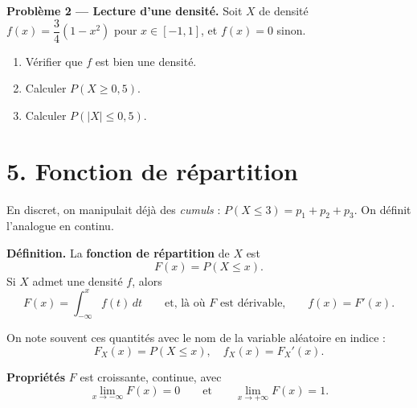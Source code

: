\textbf{Problème 2 --- Lecture d'une densité.}
Soit $X$ de densité $f(x)=\dfrac{3}{4}(1-x^2)$ pour $x\in[-1,1]$,
et $f(x)=0$ sinon.
\begin{enumerate}
  \item Vérifier que $f$ est bien une densité.
  \item Calculer $P(X\ge 0{,}5)$.
  \item Calculer $P(|X|\le 0{,}5)$.
\end{enumerate}

\section*{5. Fonction de répartition}

En discret, on manipulait déjà des \emph{cumuls} :
\(P(X\le 3)=p_1+p_2+p_3\).
On définit l'analogue en continu.

\begin{mdframed}[backgroundcolor=ThemeLight, linecolor=Theme,
  linewidth=1pt, innertopmargin=8pt, innerbottommargin=8pt, nobreak=true]
\textbf{Définition.}
La \textbf{fonction de répartition} de $X$ est
\[
  \boxed{F(x)=P(X\le x).}
\]
Si $X$ admet une densité $f$, alors
\[
  F(x)=\int_{-\infty}^{x} f(t)\,dt
  \qquad\text{et, là où $F$ est dérivable,}\qquad
  f(x)=F'(x).
\]

On note souvent ces quantités avec le nom de la variable aléatoire en indice : 
\[
  F_X(x)=P(X\le x), \quad f_X(x)=F_X'(x).
\]
\end{mdframed}

\textbf{Propriétés}
$F$ est croissante, continue, avec
\[\lim_{x\to-\infty}F(x)=0
\qquad \text{et} \qquad \lim_{x\to+\infty}F(x)=1.\]

